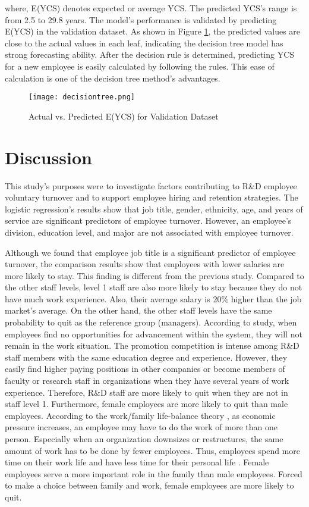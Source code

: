 where, E(YCS) denotes expected or average YCS. The predicted YCS’s range is from 2.5 to 29.8 years. The model’s performance is validated by predicting E(YCS) in the validation dataset. As shown in Figure \ref{fig:decsiontree}, the predicted values are close to the actual values in each leaf, indicating the decision tree model has strong forecasting ability. After the decision rule is determined, predicting YCS for a new employee is easily calculated by following the rules. This ease of calculation is one of the decision tree method’s advantages. 
\begin{figure}
	\centering
	\texttt{[image: decisiontree.png]}
	\caption{Actual vs. Predicted E(YCS) for Validation Dataset}
	\label{fig:decsiontree}
\end{figure}
\section{Discussion}
This study’s purposes were to investigate factors contributing to R\&D employee voluntary turnover and to support employee hiring and retention strategies. The logistic regression’s results show that job title, gender, ethnicity, age, and years of service are significant predictors of employee turnover. However, an employee’s division, education level, and major are not associated with employee turnover. 

Although we found that employee job title is a significant predictor of employee turnover, the comparison results show that employees with lower salaries are more likely to stay. This finding is different from the previous study. Compared to the other staff levels, level 1 staff are also more likely to stay because they do not have much work experience. Also, their average salary is 20\% higher than the job market’s average. On the other hand, the other staff levels have the same probability to quit as the reference group (managers). According to \citet{RN37} study, when employees find no opportunities for advancement within the system, they will not remain in the work situation. The promotion competition is intense among R\&D staff members with the same education degree and experience. However, they easily find higher paying positions in other companies or become members of faculty or research staff in organizations when they have several years of work experience. Therefore, R\&D staff are more likely to quit when they are not in staff level 1.  
Furthermore, female employees are more likely to quit than male employees. According to the work/family life-balance theory \citep{RN38}, as economic pressure increases, an employee may have to do the work of more than one person. Especially when an organization downsizes or restructures, the same amount of work has to be done by fewer employees. Thus, employees spend more time on their work life and have less time for their personal life \citep{smith2009}. Female employees serve a more important role in the family than male employees. Forced to make a choice between family and work, female employees are more likely to quit. 

